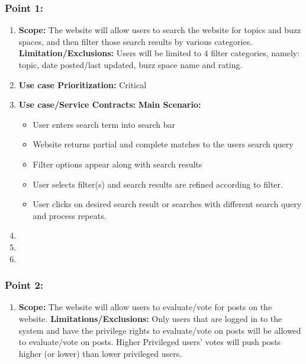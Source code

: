 \documentclass[11pt]{article}
\begin{document}
\begin{enumerate}
\subsubsection{Point 1: }
\begin{enumerate}
\item \textbf{Scope: }
The website will allow users to search the website for topics and buzz spaces, and then filter those search results by various categories. \newline \newline
	  \textbf{Limitation/Exclusions: }
Users will be limited to 4 filter categories, namely: topic, date posted/last updated, buzz space name and rating.
\item \textbf{Use case Prioritization: } Critical
\item \textbf{Use case/Service Contracts: } \newline \newline
	  \textbf{Main Scenario: }
	  \begin{itemize}
	  \item User enters search term into search bar
	  \item Website returns partial and complete matches to the users search query
	  \item Filter options appear along with search results
	  \item User selects filter(s) and search results are refined according to filter.
	  \item User clicks on desired search result or searches with different search query and process repeats.
	  \end{itemize}
	  \item
	  \item
	  \item
	  \end{enumerate}
	  
	  \subsubsection{Point 2:}
	  \begin{enumerate}
	  
	  
	  \item \textbf{Scope:} The website will allow users to evaluate/vote for posts on the website. \newline \newline
	  \textbf{Limitations/Exclusions:} Only users that are logged in to the system and have the privilege rights to evaluate/vote on posts will be allowed to evaluate/vote on posts. Higher Privileged users' votes will push posts higher (or lower) than lower privileged users. \newline \newline
	  

\end{enumerate}
\end{enumerate}
\end{document}
